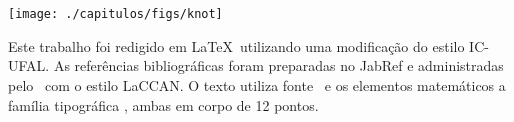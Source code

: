 \documentclass[tcc]{ic}
\begin{document}
\chapter*{}
\vfill
\singlespacing
\thispagestyle{empty}
\begin{center}
\texttt{[image: ./capitulos/figs/knot]}

\vspace{.5cm}

Este trabalho foi redigido em {\large \LaTeX}\ utilizando uma modificação do estilo \textsf{IC-UFAL}.
As referências bibliográficas foram preparadas no \textsf{JabRef} e administradas pelo {\large\BibTeX}\ com o estilo \textsf{LaCCAN}.
O texto utiliza fonte \NomeFonte\ e os elementos matemáticos a família tipográfica \NomeFonteMat, ambas em corpo de 12 pontos.
\vspace{.5cm}
\end{center}
\end{document}
